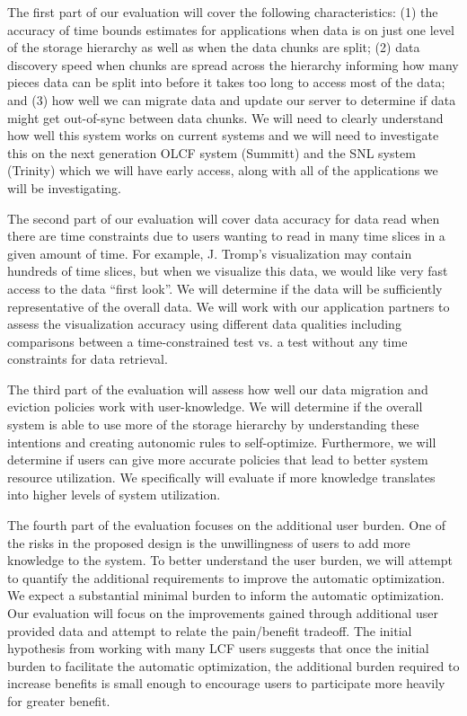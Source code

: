 The first part of our evaluation will cover the following characteristics: (1)
the accuracy of time bounds estimates for applications when data is on just one
level of the storage hierarchy as well as when the data chunks are split; (2)
data discovery speed when chunks are spread across the hierarchy informing how
many pieces data can be split into before it takes too long to access most of
the data; and (3) how well we can migrate data and update our server to
determine if data might get out-of-sync between data chunks.  We will need to
clearly understand how well this system works on current systems and we will
need to investigate this on the next generation OLCF system (Summitt) and the
SNL system (Trinity) which we will have early access, along with all of the
applications we will be investigating.

The second part of our evaluation will cover data accuracy for data read when
there are time constraints due to users wanting to read in many time slices in
a given amount of time. For example, J. Tromp's visualization may contain
hundreds of time slices, but when we visualize this data, we would like very
fast access to the data ``first look''. We will determine if the data will be
sufficiently representative of the overall data.  We will work with our
application partners to assess the visualization accuracy using different data
qualities including comparisons between a time-constrained test vs. a test
without any time constraints for data retrieval.

The third part of the evaluation will assess how well our data migration and
eviction policies work with user-knowledge. We will determine if the overall
system is able to use more of the storage hierarchy by understanding these
intentions and creating autonomic rules to self-optimize. Furthermore, we will
determine if users can give more accurate policies that lead to better system
resource utilization. We specifically will evaluate if more knowledge
translates into higher levels of system utilization.

The fourth part of the evaluation focuses on the additional user burden. One of
the risks in the proposed design is the unwillingness of users to add more
knowledge to the system. To better understand the user burden, we will attempt
to quantify the additional requirements to improve the automatic optimization.
We expect a substantial minimal burden to inform the automatic optimization.
Our evaluation will focus on the improvements gained through additional user
provided data and attempt to relate the pain/benefit tradeoff. The initial
hypothesis from working with many LCF users suggests that once the initial
burden to facilitate the automatic optimization, the additional burden required
to increase benefits is small enough to encourage users to participate more
heavily for greater benefit.

